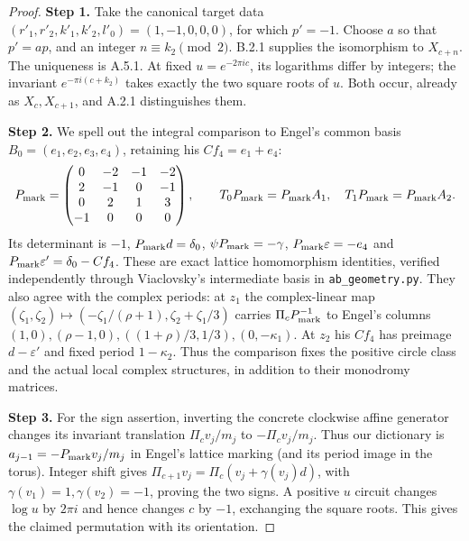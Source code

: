 \documentclass[11pt,a4paper]{article}
\theoremstyle{plain}
\theoremstyle{definition}
\begin{document}
\begin{proof}
\par\smallskip\noindent\textbf{Step 1.} Take the canonical target data $(r'_1,r'_2,k'_1,k'_2,l'_0)=(1,-1,0,0,0)$, for which $p'=-1$. Choose $a$ so that $p'=ap$, and an integer $n\equiv k_2\pmod2$. B.2.1 supplies the isomorphism to $X_{c+n}$. The uniqueness is A.5.1. At fixed $u=e^{-2\pi ic}$, its logarithms differ by integers; the invariant $e^{-\pi i(c+k_2)}$ takes exactly the two square roots of $u$. Both occur, already as $X_c,X_{c+1}$, and A.2.1 distinguishes them.

\par\smallskip\noindent\textbf{Step 2.} We spell out the integral comparison to Engel's common basis $B_0=(e_1,e_2,e_3,e_4)$, retaining his $C f_4=e_1+e_4$:
\[
 P_{\rm mark}=\begin{pmatrix}0&-2&-1&-2\\2&-1&0&-1\\0&2&1&3\\-1&0&0&0\end{pmatrix},\qquad
 T_0P_{\rm mark}=P_{\rm mark}A_1,\quad T_1P_{\rm mark}=P_{\rm mark}A_2.
\]
Its determinant is $-1$, $P_{\rm mark}d=\delta_0$, $\psi P_{\rm mark}=-\gamma$, $P_{\rm mark}\varepsilon=-e_4$ and $P_{\rm mark}\varepsilon'=\delta_0-Cf_4$. These are exact lattice homomorphism identities, verified independently through Viaclovsky's intermediate basis in \texttt{ab\_geometry.py}. They also agree with the complex periods: at $z_1$ the complex-linear map
$(\zeta_1,\zeta_2)\mapsto(-\zeta_1/(\rho+1),\zeta_2+\zeta_1/3)$ carries $\Pi_cP_{\rm mark}^{-1}$ to Engel's columns $(1,0),(\rho-1,0),((1+\rho)/3,1/3),(0,-\kappa_1)$. At $z_2$ his $Cf_4$ has preimage $d-\varepsilon'$ and fixed period $1-\kappa_2$. Thus the comparison fixes the positive circle class and the actual local complex structures, in addition to their monodromy matrices.

\par\smallskip\noindent\textbf{Step 3.} For the sign assertion, inverting the concrete clockwise affine generator changes its invariant translation $\Pi_cv_j/m_j$ to $-\Pi_cv_j/m_j$. Thus our dictionary is $a_{j-1}=-P_{\rm mark}v_j/m_j$ in Engel's lattice marking (and its period image in the torus). Integer shift gives $\Pi_{c+1}v_j=\Pi_c(v_j+\gamma(v_j)d)$, with $\gamma(v_1)=1,\gamma(v_2)=-1$, proving the two signs. A positive $u$ circuit changes $\log u$ by $2\pi i$ and hence changes $c$ by $-1$, exchanging the square roots. This gives the claimed permutation with its orientation.
\end{proof}
\end{document}
